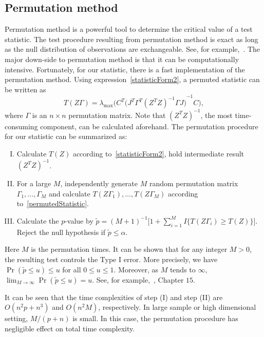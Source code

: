 \documentclass[review]{elsarticle}
\theoremstyle{plain}
\theoremstyle{definition}
\theoremstyle{remark}
\begin{document}
\subsection{Permutation method}
Permutation method is a powerful tool to determine the critical value of a test statistic.
   The test procedure resulting from permutation method is exact as long as the null distribution of observations are exchangeable. See, for example,~\cite{Romano1990On}.
   The major down-side to permutation method is that it can be computationally intensive.
   Fortunately, for our statistic, there is a fast implementation of the permutation method.
   Using expression~\eqref{statisticForm2}, a permuted statistic can be written as
    \begin{equation}\label{permutedStatistic}
        T(Z\Gamma)=\lambda_{\max}\Big(C^T{\big( J^T \Gamma^T {(Z^T Z)}^{-1} \Gamma J \big)}^{-1}  C\Big),
    \end{equation}
where $\Gamma$ is an $n\times n$ permutation matrix.
   Note that ${(Z^T Z)}^{-1}$, the most time-consuming component, can be calculated aforehand.
   The permutation procedure for our statistic can be summarized as:
   \begin{enumerate}[(I)]
       \item Calculate $T(Z)$ according to~\eqref{statisticForm2}, hold intermediate result ${(Z^T Z)}^{-1}$.
       \item For a large $M$, independently generate $M$ random permutation matrix $\Gamma_1,\ldots,\Gamma_M$ and calculate $T(Z\Gamma_1),\ldots,T(Z\Gamma_M)$ according to~\eqref{permutedStatistic}. 
       \item Calculate the $p$-value by
           $
           \tilde{p}={(M+1)}^{-1}\big[1+\sum_{i=1}^M I\{T(Z\Gamma_i)\geq T(Z)\}\big]
           $.
           Reject the null hypothesis if $\tilde{p}\leq \alpha$.
   \end{enumerate}

Here $M$ is the permutation times. 
   It can be shown that for any integer $M>0$, the resulting test controls the Type I error. More precisely, we have $\Pr(\tilde{p}\leq u)\leq u$ for all $0\leq u\leq 1$.
   Moreover, as $M$ tends to $\infty$, $\lim_{M\to \infty}\Pr(\tilde{p}\leq u)= u$.
   See, for example,~\cite{Lehmann}, Chapter $15$.

   It can be seen that the time complexities of step (I) and step (II) are $O(n^2 p +n^3)$ and $O(n^2 M)$, respectively.
   In large sample or high dimensional setting, $M/(p+n)$ is small. In this case, the permutation procedure has negligible effect on total time complexity.
\end{document}
